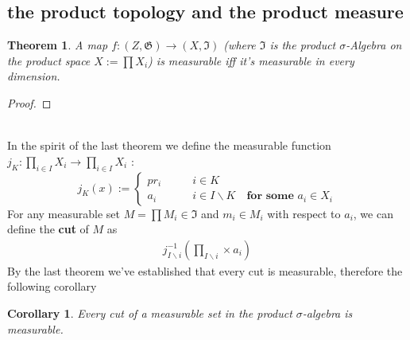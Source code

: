 \documentclass[a4paper,11pt,oneside,fleqn]{book}
\newtheorem{theorem}{Theorem}[section]
\newtheorem{corollary}{Corollary}[theorem]
\theoremstyle{definition}
\theoremstyle{remark}
\begin{document}
\subsection{the product topology and the product measure}
\begin{theorem}
	A map $f: (Z, \mathfrak{G}) \rightarrow (X, \mathfrak{I})$ (where $\mathfrak{I}$ is the product $\sigma$-Algebra on the product space $X := \prod X_i$) is measurable iff it's measurable in every dimension.
\end{theorem}
\begin{proof}
\end{proof}
\quad\\
In the spirit of the last theorem we define the measurable function $j_K: \prod_{i \in I} X_i \rightarrow \prod_{i \in I} X_i$ :
\begin{equation*}
j_K(x) := \left\{
\begin{aligned}
	pr_i \qquad &i \in K\\
	a_i \qquad  &i \in I \backslash K \quad \textbf{for some $a_i \in X_i$}
\end{aligned}
\right.	
\end{equation*}
For any measurable set $M = \prod M_i \in \mathfrak{I}$ and $m_i \in M_i$ with respect to $a_i$, we can define the \textbf{cut} of $M$ as
\begin{align*}
	j_{I \backslash i} ^{-1}(\prod_{I \backslash i} \times a_i)
\end{align*}
By the last theorem we've established that every cut is measurable, therefore the following corollary
\begin{corollary}
	Every cut of a measurable set in the product $\sigma$-algebra is measurable.
\end{corollary}
\end{document}
